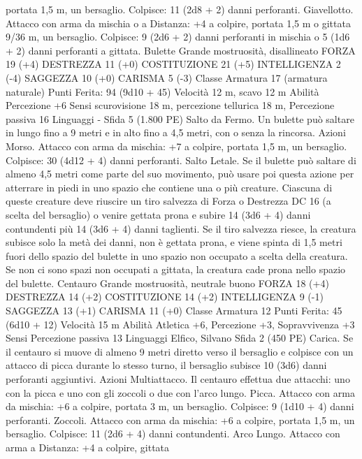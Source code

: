 \begin{multicols}{2}
portata 1,5 m, un bersaglio.
Colpisce: 11 (2d8 + 2) danni perforanti.
Giavellotto. Attacco con arma da mischia o a Distanza: +4 a
colpire, portata 1,5 m o gittata 9/36 m, un bersaglio.
Colpisce: 9 (2d6 + 2) danni perforanti in mischia o 5 (1d6 + 2)
danni perforanti a gittata.
Bulette
Grande mostruosità, disallineato
FORZA 19 (+4)
DESTREZZA 11 (+0)
COSTITUZIONE 21 (+5)
INTELLIGENZA 2 (-4)
SAGGEZZA 10 (+0)
CARISMA 5 (-3)
Classe Armatura 17 (armatura naturale)
\hspace*{0pt}\hfill{Punti Ferita}: 94 (9d10 + 45)
Velocità 12 m, scavo 12 m
Abilità Percezione +6
Sensi scurovisione 18 m, percezione tellurica 18 m, Percezione
passiva 16
Linguaggi -
Sfida 5 (1.800 PE)
Salto da Fermo. Un bulette può saltare in lungo fino a 9 metri e
in alto fino a 4,5 metri, con o senza la rincorsa.
Azioni
Morso. Attacco con arma da mischia: +7 a colpire, portata 1,5
m, un bersaglio.
Colpisce: 30 (4d12 + 4) danni perforanti.
Salto Letale. Se il bulette può saltare di almeno 4,5 metri come
parte del suo movimento, può usare poi questa azione per
atterrare in piedi in uno spazio che contiene una o più creature.
Ciascuna di queste creature deve riuscire un tiro salvezza di
Forza o Destrezza DC 16 (a scelta del bersaglio) o venire gettata
prona e subire 14 (3d6 + 4) danni contundenti più 14 (3d6 + 4)
danni taglienti. Se il tiro salvezza riesce, la creatura subisce solo
la metà dei danni, non è gettata prona, e viene spinta di 1,5 metri
fuori dello spazio del bulette in uno spazio non occupato a scelta
della creatura. Se non ci sono spazi non occupati a gittata, la
creatura cade prona nello spazio del bulette.
Centauro
Grande mostruosità, neutrale buono
FORZA 18 (+4)
DESTREZZA 14 (+2)
COSTITUZIONE 14 (+2)
INTELLIGENZA 9 (-1)
SAGGEZZA 13 (+1)
CARISMA 11 (+0)
Classe Armatura 12
\hspace*{0pt}\hfill{Punti Ferita}: 45 (6d10 + 12)
Velocità 15 m
Abilità Atletica +6, Percezione +3, Sopravvivenza +3
Sensi Percezione passiva 13
Linguaggi Elfico, Silvano
Sfida 2 (450 PE)
Carica. Se il centauro si muove di almeno 9 metri diretto verso il
bersaglio e colpisce con un attacco di picca durante lo stesso
turno, il bersaglio subisce 10 (3d6) danni perforanti aggiuntivi.
Azioni
Multiattacco. Il centauro effettua due attacchi: uno con la picca e
uno con gli zoccoli o due con l’arco lungo.
Picca. Attacco con arma da mischia: +6 a colpire, portata 3 m,
un bersaglio.
Colpisce: 9 (1d10 + 4) danni perforanti.
Zoccoli. Attacco con arma da mischia: +6 a colpire, portata 1,5
m, un bersaglio.
Colpisce: 11 (2d6 + 4) danni contundenti.
Arco Lungo. Attacco con arma a Distanza: +4 a colpire, gittata

\end{multicols}

